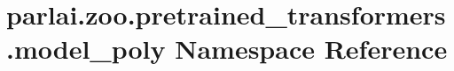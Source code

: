 \hypertarget{namespaceparlai_1_1zoo_1_1pretrained__transformers_1_1model__poly}{}\section{parlai.\+zoo.\+pretrained\+\_\+transformers.\+model\+\_\+poly Namespace Reference}
\label{namespaceparlai_1_1zoo_1_1pretrained__transformers_1_1model__poly}
